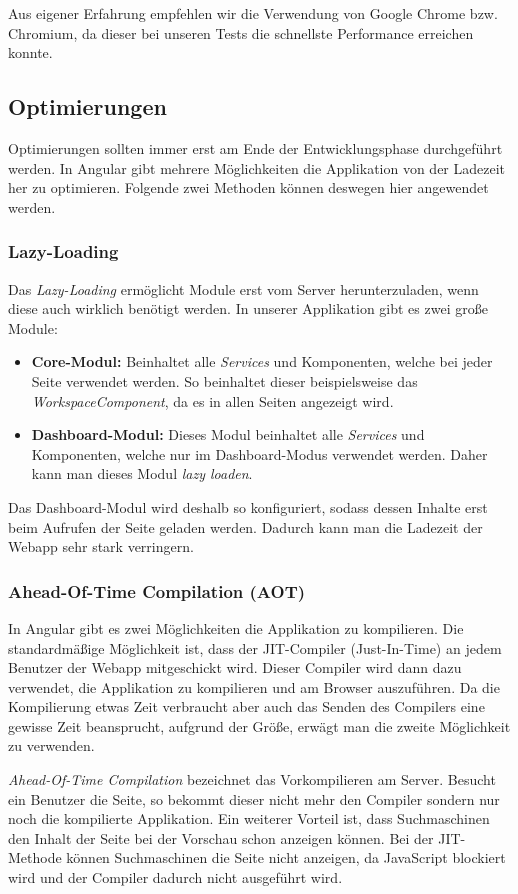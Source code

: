 Aus eigener Erfahrung empfehlen wir die Verwendung von Google Chrome bzw. Chromium, da dieser bei unseren Tests die schnellste Performance erreichen konnte.

\clearpage
\subsection{Optimierungen}
Optimierungen sollten immer erst am Ende der Entwicklungsphase durchgeführt werden. In Angular gibt mehrere Möglichkeiten die Applikation von der Ladezeit her zu optimieren. Folgende zwei Methoden können deswegen hier angewendet werden.
\subsubsection{Lazy-Loading}
\label{sec:lazy-loading}
Das \textit{Lazy-Loading} ermöglicht Module erst vom Server herunterzuladen, wenn diese auch wirklich benötigt werden. In unserer Applikation gibt es zwei große Module:
\begin{itemize}
    \item \textbf{Core-Modul:} Beinhaltet alle \textit{Services} und Komponenten, welche bei jeder Seite verwendet werden. So beinhaltet dieser beispielsweise das \textit{WorkspaceComponent}, da es in allen Seiten angezeigt wird.
    \item \textbf{Dashboard-Modul:} Dieses Modul beinhaltet alle \textit{Services} und Komponenten, welche nur im Dashboard-Modus verwendet werden. Daher kann man dieses Modul \textit{lazy loaden}.
\end{itemize}

Das Dashboard-Modul wird deshalb so konfiguriert, sodass dessen Inhalte erst beim Aufrufen der Seite geladen werden. Dadurch kann man die Ladezeit der Webapp sehr stark verringern.
\subsubsection{Ahead-Of-Time Compilation (AOT)}
In Angular gibt es zwei Möglichkeiten die Applikation zu kompilieren. Die standardmäßige Möglichkeit ist, dass der JIT-Compiler (Just-In-Time) an jedem Benutzer der Webapp mitgeschickt wird. Dieser Compiler wird dann dazu verwendet, die Applikation zu kompilieren und am Browser auszuführen. Da die Kompilierung etwas Zeit verbraucht aber auch das Senden des Compilers eine gewisse Zeit beansprucht, aufgrund der Größe, erwägt man die zweite Möglichkeit zu verwenden.\cite{aot}

\textit{Ahead-Of-Time Compilation} bezeichnet das Vorkompilieren am Server. Besucht ein Benutzer die Seite, so bekommt dieser nicht mehr den Compiler sondern nur noch die kompilierte Applikation. Ein weiterer Vorteil ist, dass Suchmaschinen den Inhalt der Seite bei der Vorschau schon anzeigen können. Bei der JIT-Methode können Suchmaschinen die Seite nicht anzeigen, da JavaScript blockiert wird und der Compiler dadurch nicht ausgeführt wird.


